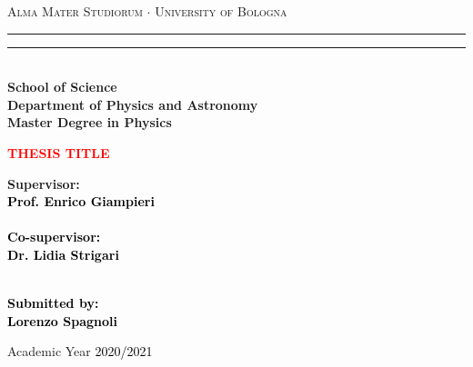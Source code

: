 \documentclass[12pt,a4paper]{report}
\theoremstyle{definition}
\theoremstyle{remark}
\begin{document}
\begin{titlepage}
%
%
%
%
\begin{center}
{{\Large{\textsc{Alma Mater Studiorum $\cdot$ University of  Bologna}}}} 
\rule[0.1cm]{15.8cm}{0.1mm}
\rule[0.5cm]{15.8cm}{0.6mm}
\\\vspace{3mm}
{\small{\bf School of Science \\
Department of Physics and Astronomy\\
Master Degree in Physics}}
\end{center}

\vspace{23mm}

\begin{center}\textcolor{red}{
%
%
{\LARGE{\bf THESIS TITLE}}\\
}\end{center}

\vspace{50mm} \par \noindent

\begin{minipage}[t]{0.47\textwidth}
%
%
{\large{\bf Supervisor: \vspace{2mm}\\\textcolor{black}{
Prof. Enrico Giampieri}\\\\
%
%
%
\textcolor{black}{
\bf Co-supervisor:\vspace{2mm}\\
Dr. Lidia Strigari\\\\}}}
\end{minipage}
%
\hfill
%
\begin{minipage}[t]{0.47\textwidth}\raggedleft \textcolor{black}{
{\large{\bf Submitted by:
\vspace{2mm}\\
%
%
\textcolor{black}{
Lorenzo Spagnoli}}}
}
\end{minipage}

\vspace{40mm}

\begin{center}
%
%
Academic Year \textcolor{black}{2020/2021}
\end{center}

\end{titlepage}
\end{document}
